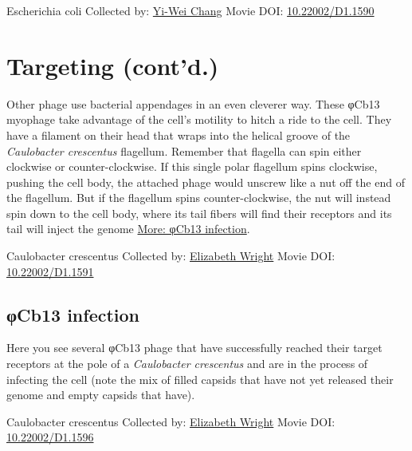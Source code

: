\documentclass[]{tufte-book}
\begin{document}
\hypertarget{htmlwidget-7719989989517126d3a1}{}

\label{fig:10-5}Escherichia coli Collected by: \protect\hyperlink{yi-wei_chang}{Yi-Wei Chang} Movie DOI: \href{https://doi.org/10.22002/D1.1590}{10.22002/D1.1590}

\hypertarget{targeting-contd.}{%
\section{Targeting (cont'd.)}\label{targeting-contd.}}

Other phage use bacterial appendages in an even cleverer way. These φCb13 myophage take advantage of the cell's motility to hitch a ride to the cell. They have a filament on their head that wraps into the helical groove of the \emph{Caulobacter crescentus} flagellum. Remember that flagella can spin either clockwise or counter-clockwise. If this single polar flagellum spins clockwise, pushing the cell body, the attached phage would unscrew like a nut off the end of the flagellum. But if the flagellum spins counter-clockwise, the nut will instead spin down to the cell body, where its tail fibers will find their receptors and its tail will inject the genome \protect\hyperlink{ux3c6Cb13_infection}{More: φCb13 infection}.



\hypertarget{htmlwidget-7b27d2dae349fd295395}{}

\label{fig:10-6}Caulobacter crescentus Collected by: \protect\hyperlink{elizabeth_wright}{Elizabeth Wright} Movie DOI: \href{https://doi.org/10.22002/D1.1591}{10.22002/D1.1591}

\hypertarget{ux3c6Cb13_infection}{%
\subsection{φCb13 infection}\label{ux3c6Cb13_infection}}

Here you see several φCb13 phage that have successfully reached their target receptors at the pole of a \emph{Caulobacter crescentus} and are in the process of infecting the cell (note the mix of filled capsids that have not yet released their genome and empty capsids that have).



\hypertarget{htmlwidget-b830d5611bc6d2489fe4}{}

\label{fig:10-6a}Caulobacter crescentus Collected by: \protect\hyperlink{elizabeth_wright}{Elizabeth Wright} Movie DOI: \href{https://doi.org/10.22002/D1.1596}{10.22002/D1.1596}
\end{document}

